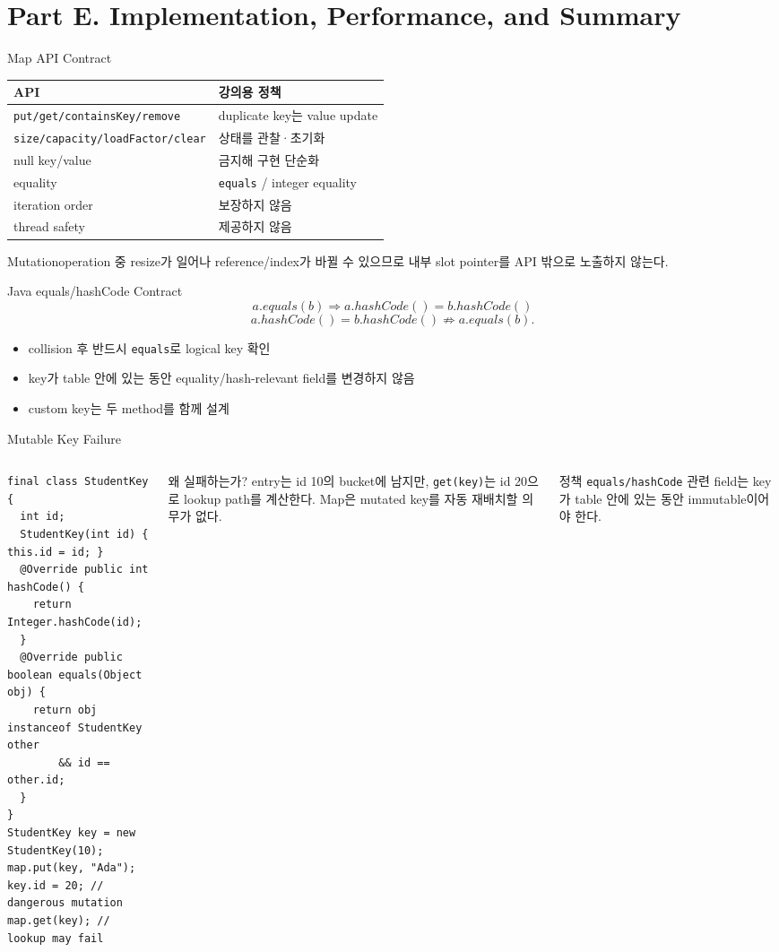 \section{Part E. Implementation, Performance, and Summary}
\begin{frame}{Map API Contract}
\small\begin{tabular}{ll}\toprule
API&강의용 정책\\\midrule
\texttt{put/get/containsKey/remove}&duplicate key는 value update\\
\texttt{size/capacity/loadFactor/clear}&상태를 관찰·초기화\\
null key/value&금지해 구현 단순화\\
equality&\texttt{equals} / integer equality\\
iteration order&보장하지 않음\\
thread safety&제공하지 않음\\\bottomrule
\end{tabular}
\begin{alertblock}{Mutation}operation 중 resize가 일어나 reference/index가 바뀔 수 있으므로 내부 slot pointer를 API 밖으로 노출하지 않는다.\end{alertblock}
\end{frame}
\begin{frame}{Java equals/hashCode Contract}
\[
a.equals(b)\Rightarrow a.hashCode()=b.hashCode()
\]
\[
a.hashCode()=b.hashCode()\not\Rightarrow a.equals(b).
\]
\begin{itemize}\item collision 후 반드시 \texttt{equals}로 logical key 확인\item key가 table 안에 있는 동안 equality/hash-relevant field를 변경하지 않음\item custom key는 두 method를 함께 설계\end{itemize}
\end{frame}
\begin{frame}[fragile]{Mutable Key Failure}
\begin{columns}[T]
\begin{lstlisting}[style=jcode,basicstyle=\ttfamily\tiny]
final class StudentKey {
  int id;
  StudentKey(int id) { this.id = id; }
  @Override public int hashCode() {
    return Integer.hashCode(id);
  }
  @Override public boolean equals(Object obj) {
    return obj instanceof StudentKey other
        && id == other.id;
  }
}
StudentKey key = new StudentKey(10);
map.put(key, "Ada");
key.id = 20; // dangerous mutation
map.get(key); // lookup may fail
\end{lstlisting}
\footnotesize
\begin{alertblock}{왜 실패하는가?}
entry는 id 10의 bucket에 남지만, \texttt{get(key)}는 id 20으로
lookup path를 계산한다. Map은 mutated key를 자동 재배치할 의무가 없다.
\end{alertblock}
\begin{block}{정책}
\texttt{equals/hashCode} 관련 field는 key가 table 안에 있는 동안
immutable이어야 한다.
\end{block}
\end{columns}
\end{frame}
